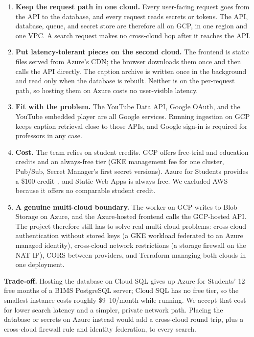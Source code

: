 \documentclass[conference]{IEEEtran}
\begin{document}
\begin{enumerate}
\item \textbf{Keep the request path in one cloud.} Every user-facing request goes from the API to the database, and every request reads secrets or tokens. The API, database, queue, and secret store are therefore all on GCP, in one region and one VPC. A search request makes no cross-cloud hop after it reaches the API.
\item \textbf{Put latency-tolerant pieces on the second cloud.} The frontend is static files served from Azure's CDN; the browser downloads them once and then calls the API directly. The caption archive is written once in the background and read only when the database is rebuilt. Neither is on the per-request path, so hosting them on Azure costs no user-visible latency.
\item \textbf{Fit with the problem.} The YouTube Data API, Google OAuth, and the YouTube embedded player are all Google services. Running ingestion on GCP keeps caption retrieval close to those APIs, and Google sign-in is required for professors in any case.
\item \textbf{Cost.} The team relies on student credits. GCP offers free-trial and education credits and an always-free tier (GKE management fee for one cluster, Pub/Sub, Secret Manager's first secret versions). Azure for Students provides a \$100 credit~\cite{azure-students}, and Static Web Apps is always free. We excluded AWS because it offers no comparable student credit.
\item \textbf{A genuine multi-cloud boundary.} The worker on GCP writes to Blob Storage on Azure, and the Azure-hosted frontend calls the GCP-hosted API. The project therefore still has to solve real multi-cloud problems: cross-cloud authentication without stored keys (a GKE workload federated to an Azure managed identity), cross-cloud network restrictions (a storage firewall on the NAT IP), CORS between providers, and Terraform managing both clouds in one deployment.
\end{enumerate}

\textbf{Trade-off.} Hosting the database on Cloud SQL gives up Azure for Students' 12 free months of a B1MS PostgreSQL server; Cloud SQL has no free tier, so the smallest instance costs roughly \$9--10/month while running. We accept that cost for lower search latency and a simpler, private network path. Placing the database or secrets on Azure instead would add a cross-cloud round trip, plus a cross-cloud firewall rule and identity federation, to every search.
\end{document}
